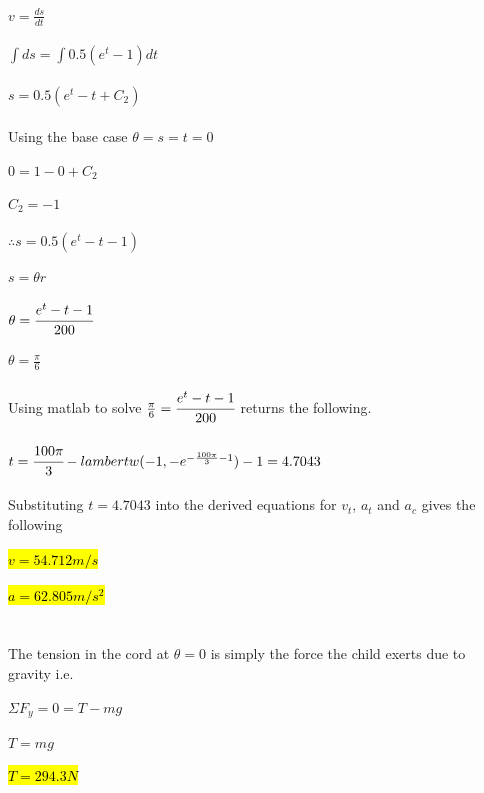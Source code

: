\documentclass{article}
\begin{document}
\subsection{}
$v = \frac{ds}{dt}$\\ \\
$\int ds = \int 0.5(e^t - 1)dt$\\ \\
$s = 0.5(e^t - t + C_2)$\\ \\
Using the base case $\theta = s = t = 0$\\ \\
$0 = 1 - 0 + C_2$\\ \\
$C_2 = -1$\\ \\
$\therefore s = 0.5(e^t - t-1)$\\ \\
$s = \theta r$\\ \\
$\theta = \cfrac{e^t - t - 1}{200}$\\ \\
$\theta = \frac{\pi}{6}$\\ \\
Using matlab to solve $\frac{\pi}{6} = \cfrac{e^t - t - 1}{200}$ returns the following. \\ \\
$ t = \cfrac{100\pi}{3} - lambertw(-1, -e^{- \frac{100\pi}{3} - 1}) - 1 = 4.7043$ \\ \\

Substituting $t = 4.7043$ into the derived equations for $v_t$, $a_t$ and $a_c$ gives the following\\ \\
\hl{$v = 54.712 m/s$} \\ \\
\hl{$a = 62.805 m/s^2$} 
\newpage
\section{}
\subsection{}
The tension in the cord at $\theta = 0$ is simply the force the child exerts due to gravity i.e.\\ \\
$\Sigma F_y = 0 = T - mg$\\ \\
$T = mg$ \\ \\
\hl{$T = 294.3N$}
\end{document}
